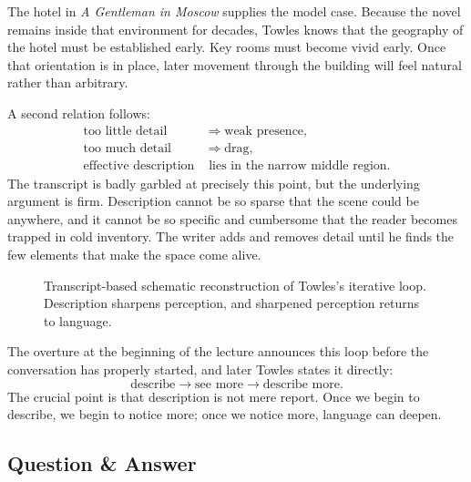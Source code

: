 The hotel in \emph{A Gentleman in Moscow} supplies the model case. Because the novel remains inside that environment for decades, Towles knows that the geography of the hotel must be established early. Key rooms must become vivid early. Once that orientation is in place, later movement through the building will feel natural rather than arbitrary.

A second relation follows:
\begin{align}
\text{too little detail} &\Rightarrow \text{weak presence}, \\
\text{too much detail} &\Rightarrow \text{drag}, \\
\text{effective description} &\text{ lies in the narrow middle region.}
\end{align}
The transcript is badly garbled at precisely this point, but the underlying argument is firm. Description cannot be so sparse that the scene could be anywhere, and it cannot be so specific and cumbersome that the reader becomes trapped in cold inventory. The writer adds and removes detail until he finds the few elements that make the space come alive.

\begin{figure}[h]
\centering
{}
\caption{Transcript-based schematic reconstruction of Towles's iterative loop. Description sharpens perception, and sharpened perception returns to language.}
\end{figure}

The overture at the beginning of the lecture announces this loop before the conversation has properly started, and later Towles states it directly:
\begin{equation}
\text{describe} \longrightarrow \text{see more} \longrightarrow \text{describe more}.
\end{equation}
The crucial point is that description is not mere report. Once we begin to describe, we begin to notice more; once we notice more, language can deepen.

\subsection{Question \& Answer}

